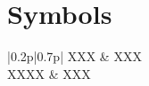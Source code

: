 \section{Symbols}

\begin{table}
	\begin{tabular}{|0.2p|0.7p|}
		XXX & XXX \\
		\hline
		XXXX & XXX \\
		\hline
	\end{tabular}
\end{table}